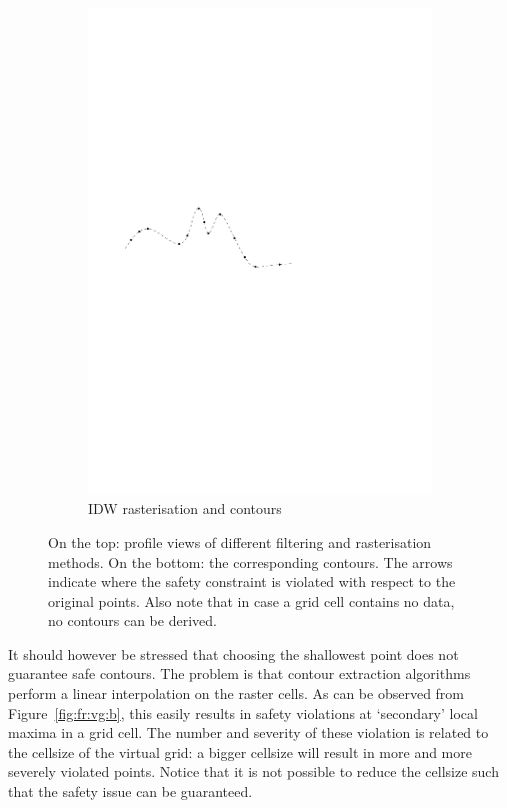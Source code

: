 \begin{figure}
\begin{subfigure}[b]{0.3\linewidth}
    \includegraphics[width=\textwidth,page=5]{figs/1Didw.pdf}
    \caption{IDW rasterisation and contours}\label{fig:fr:idw:b}
  \end{subfigure}
\caption{On the top: profile views of different filtering and rasterisation methods. On the bottom: the corresponding contours. The arrows indicate where the safety constraint is violated with respect to the original points. Also note that in case a grid cell contains no data, no contours can be derived.}
\label{fig:filterraster}
\end{figure}
It should however be stressed that choosing the shallowest point does not guarantee safe contours. 
The problem is that contour extraction algorithms perform a linear interpolation on the raster cells. 
As can be observed from Figure~\ref{fig:fr:vg:b}, this easily results in safety violations at `secondary' local maxima in a grid cell. 
The number and severity of these violation is related to the cellsize of the virtual grid: a bigger cellsize will result in more and more severely violated points.
Notice that it is not possible to reduce the cellsize such that the safety issue can be guaranteed.  

